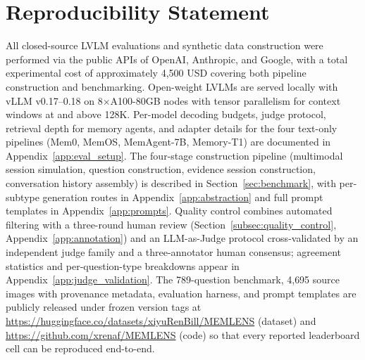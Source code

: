 \documentclass{llmxive}
\begin{document}
\section*{Reproducibility Statement}

All closed-source LVLM evaluations and synthetic data construction were performed via the public APIs of OpenAI, Anthropic, and Google, with a total experimental cost of approximately 4{,}500 USD covering both pipeline construction and benchmarking. Open-weight LVLMs are served locally with vLLM v0.17--0.18 on 8$\times$A100-80GB nodes with tensor parallelism for context windows at and above 128K. Per-model decoding budgets, judge protocol, retrieval depth for memory agents, and adapter details for the four text-only pipelines (Mem0, MemOS, MemAgent-7B, Memory-T1) are documented in Appendix~\ref{app:eval_setup}. The four-stage construction pipeline (multimodal session simulation, question construction, evidence session construction, conversation history assembly) is described in Section~\ref{sec:benchmark}, with per-subtype generation routes in Appendix~\ref{app:abstraction} and full prompt templates in Appendix~\ref{app:prompts}. Quality control combines automated filtering with a three-round human review (Section~\ref{subsec:quality_control}, Appendix~\ref{app:annotation}) and an LLM-as-Judge protocol cross-validated by an independent judge family and a three-annotator human consensus; agreement statistics and per-question-type breakdowns appear in Appendix~\ref{app:judge_validation}. The 789-question benchmark, 4{,}695 source images with provenance metadata, evaluation harness, and prompt templates are publicly released under frozen version tags at \url{https://huggingface.co/datasets/xiyuRenBill/MEMLENS} (dataset) and \url{https://github.com/xrenaf/MEMLENS} (code) so that every reported leaderboard cell can be reproduced end-to-end.




\end{document}
